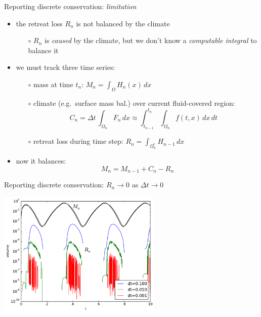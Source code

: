 \documentclass{beamer}
\begin{document}
\begin{frame}{Reporting discrete conservation: \emph{limitation}}

\begin{itemize}
\item \alert{the retreat loss $R_n$ is not balanced by the climate}
  \begin{itemize}
  \item[$\circ$] $R_n$ is \emph{caused} by the climate, but we don't know a \emph{computable integral} to balance it
  \end{itemize}
\item we must track \alert{three} time series:
  \begin{itemize}
  \item[$\circ$] mass at time $t_n$: \qquad $M_n = \int_\Omega H_n(x)\,dx$

  \smallskip
  \item[$\circ$] climate (e.g.~surface mass bal.) over current fluid-covered region:
     $$C_n = \Delta t\, \int_{\Omega_n} F_n \,dx \approx \int_{t_{n-1}}^{t_n} \int_{\Omega_n} f(t,x) \,dx\,dt$$
  \item[$\circ$] retreat loss during time step: \qquad $R_n = \int_{\Omega_n^r} H_{n-1} \,dx$
  \end{itemize}
\item now it balances:
     $$M_n = M_{n-1} + C_n - R_n$$
\end{itemize}
\end{frame}


\begin{frame}{Reporting discrete conservation: $R_n\to 0$ as $\Delta t\to 0$}

\begin{center}
\vspace{-3.3mm}


\vspace{-1.1mm}
\includegraphics[width=0.59\textwidth,keepaspectratio=true]{masstimeseries} \, \phantom{!}
\end{center}
\end{frame}
\end{document}
